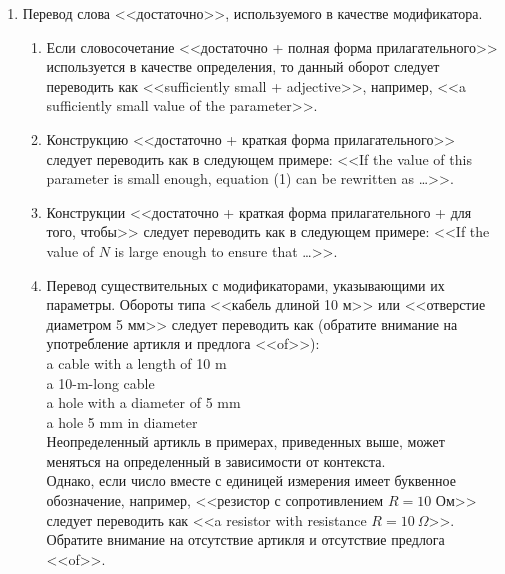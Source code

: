 \documentclass[a5paper, 10pt, twoside, numbers=enddot]{scrartcl}
\begin{document}
\begin{enumerate}
  \item Перевод слова <<достаточно>>, используемого в качестве модификатора.
    \begin{enumerate}
      \item Если словосочетание <<достаточно + полная форма прилагательного>> используется в
        качестве определения, то данный оборот следует переводить как <<sufficiently small +
        adjective>>, например, <<a sufficiently small value of the parameter>>.

      \item Конструкцию <<достаточно + краткая форма прилагательного>> следует переводить как в
        следующем примере: <<If the value of this parameter is small enough, equation (1) can be
        rewritten as \ldots>>.

      \item Конструкции <<достаточно + краткая форма прилагательного + для того, чтобы>> следует
        переводить как в следующем примере: <<If the value of $N$ is large enough to ensure that
        \ldots>>.

      \item Перевод существительных с модификаторами, указывающими их параметры. Обороты типа
        <<кабель длиной 10 м>> или <<отверстие диаметром 5 мм>> следует переводить как (обратите
        внимание на употребление артикля и предлога <<of>>):\\ [4pt]
        \textsf{
          a cable with a length of 10 m\\
          a 10-m-long cable\\
          a hole with a diameter of 5 mm\\
          a hole 5 mm in diameter\\ [4pt]
        }
        Неопределенный артикль в примерах, приведенных выше, может меняться на определенный в
        зависимости от контекста.\\ [4pt]
        Однако, если число вместе с единицей измерения имеет буквенное обозначение, например,
        <<резистор с сопротивлением $R=10$ Ом>> следует переводить как <<a resistor with
        resistance $R=10\ \Omega$>>. Обратите внимание на отсутствие артикля и отсутствие предлога
        <<of>>.
    \end{enumerate}


\end{enumerate}
\end{document}
